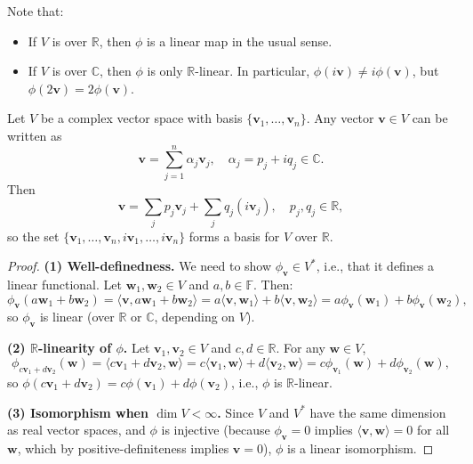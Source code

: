 \begin{remark}
Note that:
\begin{itemize}
    \item If \( V \) is over \( \mathbb{R} \), then \( \phi \) is a linear map in the usual sense.
    \item If \( V \) is over \( \mathbb{C} \), then \( \phi \) is only \(\mathbb{R}\)-linear. In particular, \( \phi(i\mathbf{v}) \neq i\phi(\mathbf{v}) \), but \( \phi(2\mathbf{v}) = 2\phi(\mathbf{v}) \).
\end{itemize}
\end{remark}

\begin{example}
Let \( V \) be a complex vector space with basis \( \{ \mathbf{v}_1, \ldots, \mathbf{v}_n \} \). Any vector \( \mathbf{v} \in V \) can be written as
\[
\mathbf{v} = \sum_{j=1}^n \alpha_j \mathbf{v}_j, \quad \alpha_j = p_j + iq_j \in \mathbb{C}.
\]
Then
\[
\mathbf{v} = \sum_j p_j \mathbf{v}_j + \sum_j q_j (i \mathbf{v}_j), \quad p_j, q_j \in \mathbb{R},
\]
so the set \( \{ \mathbf{v}_1, \ldots, \mathbf{v}_n, i\mathbf{v}_1, \ldots, i\mathbf{v}_n \} \) forms a basis for \( V \) over \( \mathbb{R} \).
\end{example}

\begin{proof}
\textbf{(1) Well-definedness.}  
We need to show \( \phi_{\mathbf{v}} \in V^* \), i.e., that it defines a linear functional. Let \( \mathbf{w}_1, \mathbf{w}_2 \in V \) and \( a, b \in \mathbb{F} \). Then:
\[
\phi_{\mathbf{v}}(a\mathbf{w}_1 + b\mathbf{w}_2) = \langle \mathbf{v}, a\mathbf{w}_1 + b\mathbf{w}_2 \rangle = a \langle \mathbf{v}, \mathbf{w}_1 \rangle + b \langle \mathbf{v}, \mathbf{w}_2 \rangle = a \phi_{\mathbf{v}}(\mathbf{w}_1) + b \phi_{\mathbf{v}}(\mathbf{w}_2),
\]
so \( \phi_{\mathbf{v}} \) is linear (over \( \mathbb{R} \) or \( \mathbb{C} \), depending on \( V \)).

\textbf{(2) \(\mathbb{R}\)-linearity of \( \phi \).}  
Let \( \mathbf{v}_1, \mathbf{v}_2 \in V \) and \( c, d \in \mathbb{R} \). For any \( \mathbf{w} \in V \),
\[
\phi_{c\mathbf{v}_1 + d\mathbf{v}_2}(\mathbf{w}) = \langle c\mathbf{v}_1 + d\mathbf{v}_2, \mathbf{w} \rangle = c \langle \mathbf{v}_1, \mathbf{w} \rangle + d \langle \mathbf{v}_2, \mathbf{w} \rangle = c \phi_{\mathbf{v}_1}(\mathbf{w}) + d \phi_{\mathbf{v}_2}(\mathbf{w}),
\]
so \( \phi(c\mathbf{v}_1 + d\mathbf{v}_2) = c\phi(\mathbf{v}_1) + d\phi(\mathbf{v}_2) \), i.e., \( \phi \) is \(\mathbb{R}\)-linear.

\textbf{(3) Isomorphism when \(\dim V < \infty\).}  
Since \( V \) and \( V^* \) have the same dimension as real vector spaces, and \( \phi \) is injective (because \( \phi_{\mathbf{v}} = 0 \) implies \( \langle \mathbf{v}, \mathbf{w} \rangle = 0 \) for all \( \mathbf{w} \), which by positive-definiteness implies \( \mathbf{v} = 0 \)), \( \phi \) is a linear isomorphism.
\end{proof}

